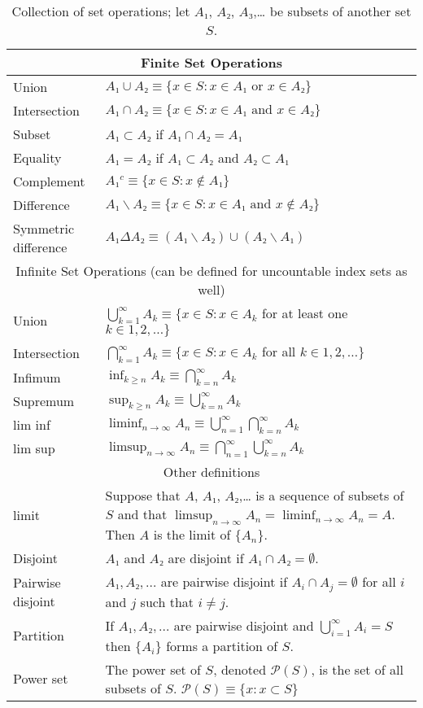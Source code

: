 \begin{itemize}
\begin{table*}[t]
\begin{tabular}{lp{4in}}
  \toprule
  \multicolumn{2}{c}{Finite Set Operations} \\
  \midrule
  Union        & $A₁ ∪ A₂ ≡ \{x ∈ S : x ∈ A₁ \text{ or } x∈ A₂\}$ \\
  Intersection & $A₁ ∩ A₂ ≡ \{x ∈ S : x ∈ A₁ \text{ and } x ∈ A₂\}$ \\
  Subset       & $A₁ ⊂ A₂$ if $A₁ ∩ A₂ = A₁$ \\
  Equality     & $A₁ = A₂$ if $A₁ ⊂ A₂$ and $A₂ ⊂ A₁$ \\
  Complement   & $A₁^c ≡ \{x ∈ S : x ∉ A₁\}$ \\
  Difference   & $A₁ ∖ A₂ ≡ \{x ∈ S : x ∈ A₁ \text{ and } x ∉ A₂\}$ \\
  Symmetric difference & $A₁ Δ A₂ ≡ (A₁ ∖ A₂) ∪ (A₂ ∖ A₁)$ \\
  \midrule
  \multicolumn{2}{c}{Infinite Set Operations (can be defined for uncountable index sets as well)} \\
  \midrule
  Union        & $⋃_{k=1}^∞ A_k ≡ \{x ∈ S : x ∈ A_k$ for at least one $k ∈ 1,2,…\}$ \\
  Intersection & $⋂_{k=1}^∞ A_k ≡ \{x ∈ S : x ∈ A_k$ for all $k ∈ 1,2,…\}$ \\
  Infimum      & $\inf_{k ≥ n} A_k ≡ ⋂_{k=n}^∞ A_k$ \\
  Supremum     & $\sup_{k ≥ n} A_k ≡ ⋃_{k=n}^∞ A_k$ \\
  lim inf      & $\liminf_{n → ∞} A_n ≡ ⋃_{n=1}^∞ ⋂_{k=n}^∞ A_k$ \\
  lim sup      & $\limsup_{n → ∞} A_n ≡ ⋂_{n=1}^∞ ⋃_{k=n}^∞ A_k$ \\
  \midrule
  \multicolumn{2}{c}{Other definitions} \\
  \midrule
  limit 
  & Suppose that $A$, $A₁$, $A₂$,… is a sequence of subsets of $S$ and that $\limsup_{n → ∞} A_n = \liminf_{n → ∞} A_n = A$.
  Then $A$ is the limit of $\{A_n\}$. \\
  Disjoint 
  & $A₁$ and $A₂$ are disjoint if $A₁ ∩ A₂ = ∅$. \\
  Pairwise disjoint 
  & $A₁, A₂, …$ are pairwise disjoint if $A_i ∩ A_j = ∅$ for all $i$ and $j$ such that $i ≠ j$. \\
  Partition & If $A₁,A₂,…$ are pairwise disjoint and $⋃_{i=1}^∞ A_i = S$ then $\{A_i\}$ forms a partition of $S$. \\
  Power set & The power set of $S$, denoted $\mathcal{P}(S)$, is the set of all subsets of $S$.
  $\mathcal{P}(S) ≡ \{x : x ⊂ S\}$ \\
\bottomrule
\end{tabular}
  \caption{Collection of set operations; let $A₁$, $A₂$, $A₃$,… be subsets of another set $S$.}
  \label{tab:1}
\end{table*}


\end{itemize}
